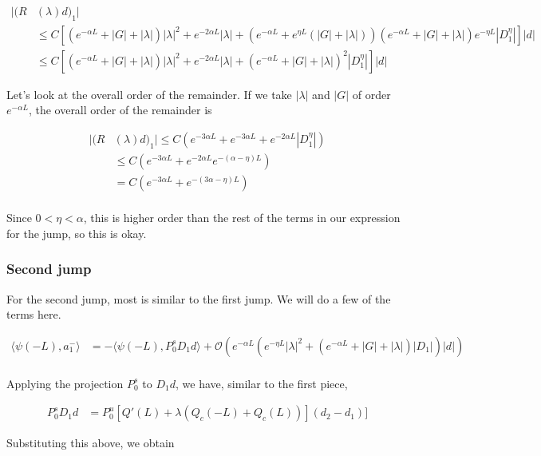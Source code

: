 \documentclass[12pt]{article}
\begin{document}
\begin{align*}
|(R&(\lambda)d)_1|  \\
&\leq C \left[ (e^{-\alpha L} + |G| + |\lambda|) |\lambda|^2 + e^{-2\alpha L}|\lambda| +(e^{-\alpha L} + e^{\eta L}(|G| + |\lambda|))(e^{-\alpha L} + |G| + |\lambda|)e^{-\eta L} |D_1^{\eta}|  \right] |d| \\
&\leq C \left[ (e^{-\alpha L} + |G| + |\lambda|)|\lambda|^2 + e^{-2\alpha L}|\lambda| + (e^{-\alpha L} + |G| + |\lambda|)^2 |D_1^{\eta}|  \right] |d|
\end{align*}

Let's look at the overall order of the remainder. If we take $|\lambda|$ and $|G|$ of order $e^{-\alpha L}$, the overall order of the remainder is

\begin{align*}
|(R&(\lambda)d)_1| \leq C ( e^{-3 \alpha L} + e^{-3 \alpha L} + e^{-2 \alpha L} |D_1^{\eta}| ) \\
&\leq C ( e^{-3 \alpha L} + e^{-2 \alpha L} e^{-(\alpha - \eta)L}) \\
&= C ( e^{-3 \alpha L} + e^{-(3 \alpha - \eta) L} )\\
\end{align*}

Since $0 < \eta < \alpha$, this is higher order than the rest of the terms in our expression for the jump, so this is okay.\\

\subsubsection*{Second jump}

For the second jump, most is similar to the first jump. We will do a few of the terms here.

\begin{align*}
\langle \psi(-L), a_1^- \rangle &= -\langle \psi(-L), P_0^s D_1 d \rangle + \mathcal{O} \left( e^{-\alpha L} (e^{-\eta L}|\lambda|^2 + (e^{-\alpha L} + |G| + |\lambda|)|D_1|)|d| \right)\\
\end{align*}

Applying the projection $P_0^s$ to $D_1 d$, we have, similar to the first piece,

\begin{align*}
P_0^s D_1 d &= P_0^u [Q'(L) + \lambda(Q_c(-L) + Q_c(L))](d_2 - d_1)]
\end{align*}

Substituting this above, we obtain
\end{document}
